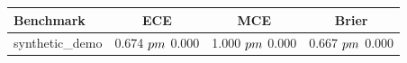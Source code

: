 \begin{tabular}{lccc}
\toprule
Benchmark & ECE & MCE & Brier \\
\midrule
synthetic_demo & 0.674 $\\pm$ 0.000 & 1.000 $\\pm$ 0.000 & 0.667 $\\pm$ 0.000 \\
\bottomrule
\end{tabular}
